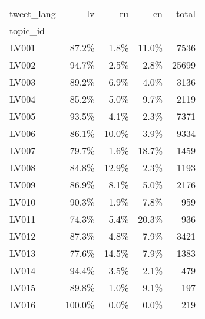 \begin{tabular}{lrrrr}
\toprule
tweet\_lang &     lv &    ru &    en &  total \\
topic\_id &        &       &       &        \\
\midrule
LV001    &  87.2\% &  1.8\% & 11.0\% &   7536 \\
LV002    &  94.7\% &  2.5\% &  2.8\% &  25699 \\
LV003    &  89.2\% &  6.9\% &  4.0\% &   3136 \\
LV004    &  85.2\% &  5.0\% &  9.7\% &   2119 \\
LV005    &  93.5\% &  4.1\% &  2.3\% &   7371 \\
LV006    &  86.1\% & 10.0\% &  3.9\% &   9334 \\
LV007    &  79.7\% &  1.6\% & 18.7\% &   1459 \\
LV008    &  84.8\% & 12.9\% &  2.3\% &   1193 \\
LV009    &  86.9\% &  8.1\% &  5.0\% &   2176 \\
LV010    &  90.3\% &  1.9\% &  7.8\% &    959 \\
LV011    &  74.3\% &  5.4\% & 20.3\% &    936 \\
LV012    &  87.3\% &  4.8\% &  7.9\% &   3421 \\
LV013    &  77.6\% & 14.5\% &  7.9\% &   1383 \\
LV014    &  94.4\% &  3.5\% &  2.1\% &    479 \\
LV015    &  89.8\% &  1.0\% &  9.1\% &    197 \\
LV016    & 100.0\% &  0.0\% &  0.0\% &    219 \\
\bottomrule
\end{tabular}

